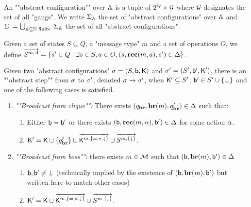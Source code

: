 \begin{definition}
	\label{def:abstract-configuration}
	An ""abstract configuration"" over $\mathbb{A}$ is a tuple of $2^Q \times \mathcal{G}$ where $\mathcal{G}$ designates the set of all "gangs". We write $\Sigma_{\mathbb{A}}$ the set of "abstract configurations" over $\mathbb{A}$ and $\Sigma := \bigcup_{\mathbb{A} \subseteq \mathbb{N} \text{ finite }}\Sigma_{\mathbb{A}}$ the set of all "abstract configurations". 
	
	Given a set of states $S \subseteq Q$, a "message type" $m$ and a set of operations $O$, we define $\overrightarrow{S^{m,A}} = \{s' \in Q \mid \exists s \in S, a\in O, (s, \textbf{rec}(m, a), s') \in \Delta\}$.
	
	Given two "abstract configurations" $\sigma = (S, \mathsf{b}, \mathsf{K})$ and $\sigma' = (S', \mathsf{b}', \mathsf{K}')$, there is an ""abstract step"" from $\sigma$ to $\sigma'$, denoted $\sigma \xrightarrow{} \sigma'$, when $\mathsf{K}' \subseteq S'$, $\mathsf{b}' \in S' \cup \{\bot\}$ and one of the following cases is satisfied.
	\begin{enumerate}
		\item \emph{""Broadcast from clique"":} There exists $(q_{\textbf{br}}, \textbf{br}(m), q_{\textbf{br}}') \in \Delta$ such that:
		\begin{enumerate}[label = (\arabic*)] 
			
			\item\label{item:broadcast_from_clique_boss} Either $\mathsf{b} = \mathsf{b}'$ or there exists $(\mathsf{b}, \textbf{rec}(m, \alpha), \mathsf{b}') \in \Delta$ for some action $\alpha$.
			
			\item\label{item:broadcast_from_clique_clique}$ \mathsf{K}' = \mathsf{K} \cup \{q_{\textbf{br}}'\}\cup \overrightarrow{\mathsf{K}^{m,\{{=}, {*}, \downarrow\}}} \cup \overrightarrow{S^{m,\{\downarrow\}}}$.
		\end{enumerate}
		
		\item \emph{""Broadcast from boss"":} there exists $m \in \mathcal{M}$ such that $(\mathsf{b}, \textbf{br}(m), \mathsf{b}') \in \Delta$
		\begin{enumerate}[label = (\arabic*)]
			
			\item\label{item:broadcast_from_boss_boss} $\mathsf{b}, \mathsf{b}' \ne \bot$ (technically implied by the existence of $(\mathsf{b}, \textbf{br}(m), \mathsf{b}')$ but written here to match other cases)
			
			\item\label{item:broadcast_from_boss_clique} $\mathsf{K}'= \mathsf{K} \cup \overrightarrow{\mathsf{K}^{m,\{{=}, {*}, \downarrow\}}} \cup \overrightarrow{S^{m,\{\downarrow\}}}$.
		\end{enumerate}
		

\end{enumerate}
\end{definition}
